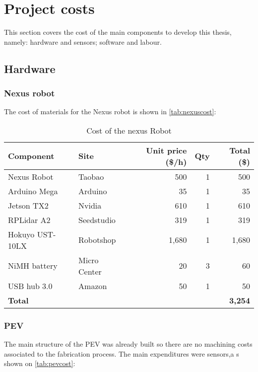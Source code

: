 
\chapter{Project costs}
\label{ch:budget}

This section covers the cost of the main components to develop this thesis, namely: hardware and sensors; software and labour.

\section{Hardware}

\subsection{Nexus robot}
The cost of materials for the Nexus robot is shown in \autoref{tab:nexuscost}:
\begin{table}[h!]
  \begin{tabular}{llrrr}
    \hline
    \textbf{Component} & \textbf{Site} & \textbf{Unit price (\$/h)} & \textbf{Qty} & \textbf{Total (\$)} \\ \hline
    Nexus Robot     & Taobao       & 500   & 1 & 500            \\
    Arduino Mega    & Arduino      & 35    & 1 & 35             \\ 
    Jetson TX2      & Nvidia       & 610   & 1 & 610            \\ 
    RPLidar A2      & Seedstudio   & 319   & 1 & 319            \\ 
    Hokuyo UST-10LX & Robotshop    & 1,680 & 1 & 1,680          \\ 
    NiMH battery    & Micro Center & 20    & 3 & 60             \\ 
    USB hub 3.0     & Amazon       & 50    & 1 & 50             \\ \hline
    \textbf{Total}  &              &       &   & \textbf{3,254} \\ \hline
  \end{tabular}
  \caption{Cost of the nexus Robot}
  \label{tab:nexuscost}
\end{table}


\subsection{PEV}
The main structure of the PEV was already built so there are no machining costs associated to the fabrication process. The main expenditures were sensors,a s shown on \autoref{tab:pevcost}:


